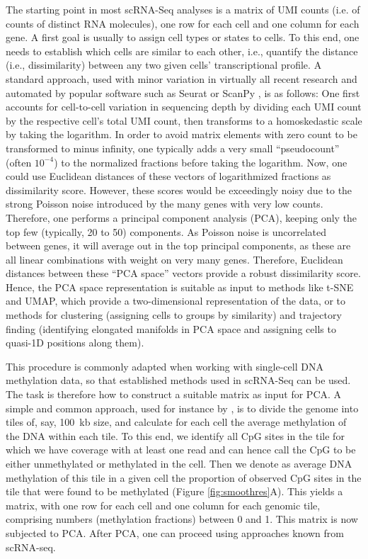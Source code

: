 \documentclass[twocolumn,10pt]{article}
\begin{document}
The starting point in most scRNA-Seq analyses is a matrix of UMI counts (i.e. of counts of distinct RNA molecules), one row for each cell and one column for each gene. A first goal is usually to assign cell types or states to cells. To this end, one needs to establish which cells are similar to each other, i.e., quantify the distance (i.e., dissimilarity) between any two given cells' transcriptional profile. A standard approach, used with minor variation in virtually all recent research and automated by popular software such as Seurat \citep{Hao_2021} or ScanPy \citep{Wolf_2018}, is as follows: One first accounts for cell-to-cell variation in sequencing depth by dividing each UMI count by the respective cell's total UMI count, then transforms to a homoskedastic scale by taking the logarithm. In order to avoid matrix elements with zero count to be transformed to minus infinity, one typically adds a very small ``pseudocount'' (often $10^{-4}$) to the normalized fractions before taking the logarithm. Now, one could use Euclidean distances of these vectors of logarithmized fractions as dissimilarity score. However, these scores would be exceedingly noisy due to the strong Poisson noise introduced by the many genes with very low counts. Therefore, one performs a principal component analysis (PCA), keeping only the top few (typically, 20 to 50) components. As Poisson noise is uncorrelated between genes, it will average out in the top principal components, as these are all linear combinations with weight on very many genes. Therefore, Euclidean distances between these ``PCA space'' vectors provide a robust dissimilarity score. Hence, the PCA space representation is suitable as input to methods like t-SNE and UMAP, which provide a two-dimensional representation of the data, or to methods for clustering (assigning cells to groups by similarity) and trajectory finding (identifying elongated manifolds in PCA space and assigning cells to quasi-1D positions along them).

This procedure is commonly adapted when working with single-cell DNA methylation data, so that established methods used in scRNA-Seq can be used.
The task is therefore how to construct a suitable matrix as input for PCA. A simple and common approach, used for instance by \citet{luo2017single}, is to divide the genome into tiles of, say, 100~kb size, and calculate for each cell the average methylation of the DNA within each tile. To this end, we identify all CpG sites in the tile for which we have coverage with at least one read and can hence call the CpG to be either unmethylated or methylated in the cell. Then we denote as average DNA methylation of this tile in a given cell the proportion of observed CpG sites in the tile that were found to be methylated (Figure \ref{fig:smoothres}A). This yields a matrix, with one row for each cell and one column for each genomic tile, comprising numbers (methylation fractions) between 0 and 1. This matrix is now subjected to PCA. After PCA, one can proceed using approaches known from scRNA-seq.
\end{document}
